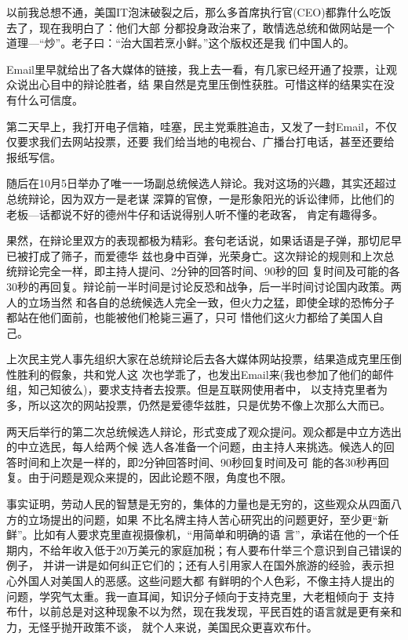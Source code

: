 ﻿\documentclass[11pt]{article}
\begin{document}
以前我总想不通，美国IT泡沫破裂之后，那么多首席执行官(CEO)都靠什么吃饭去了，现在我明白了：他们大部
分都投身政治来了，敢情选总统和做网站是一个道理---``炒''。老子曰：``治大国若烹小鲜。''这个版权还是我
们中国人的。


Email里早就给出了各大媒体的链接，我上去一看，有几家已经开通了投票，让观众说出心目中的辩论胜者，结
果自然是克里压倒性获胜。可惜这样的结果实在没有什么可信度。

第二天早上，我打开电子信箱，哇塞，民主党乘胜追击，又发了一封Email，不仅仅要求我们去网站投票，还要
我们给当地的电视台、广播台打电话，甚至还要给报纸写信。

随后在10月5日举办了唯一一场副总统候选人辩论。我对这场的兴趣，其实还超过总统辩论，因为双方一是老谋
深算的官僚，一是形象阳光的诉讼律师，比他们的老板---话都说不好的德州牛仔和话说得别人听不懂的老政客，
肯定有趣得多。

果然，在辩论里双方的表现都极为精彩。套句老话说，如果话语是子弹，那切尼早已被打成了筛子，而爱德华
兹也身中百弹，光荣身亡。这次辩论的规则和上次总统辩论完全一样，即主持人提问、2分钟的回答时间、90秒的回
复时间及可能的各30秒的再回复。辩论前一半时间是讨论反恐和战争，后一半时间讨论国内政策。两人的立场当然
和各自的总统候选人完全一致，但火力之猛，即使全球的恐怖分子都站在他们面前，也能被他们枪毙三遍了，只可
惜他们这火力都给了美国人自己。

上次民主党人事先组织大家在总统辩论后去各大媒体网站投票，结果造成克里压倒性胜利的假象，共和党人这
次也学乖了，也发出Email来(我也参加了他们的邮件组，知己知彼么)，要求支持者去投票。但是互联网使用者中，
以支持克里者为多，所以这次的网站投票，仍然是爱德华兹胜，只是优势不像上次那么大而已。

两天后举行的第二次总统候选人辩论，形式变成了观众提问。观众都是中立方选出的中立选民，每人给两个候
选人各准备一个问题，由主持人来挑选。候选人的回答时间和上次是一样的，即2分钟回答时间、90秒回复时间及可
能的各30秒再回复。由于问题是观众来提的，因此论题不限，角度也不限。

事实证明，劳动人民的智慧是无穷的，集体的力量也是无穷的，这些观众从四面八方的立场提出的问题，如果
不比名牌主持人苦心研究出的问题更好，至少更``新鲜''。比如有人要求克里直视摄像机，``用简单和明确的语
言''，承诺在他的一个任期内，不给年收入低于20万美元的家庭加税；有人要布什举三个意识到自己错误的例子，
并讲一讲是如何纠正它们的；还有人引用家人在国外旅游的经验，表示担心外国人对美国人的恶感。这些问题大都
有鲜明的个人色彩，不像主持人提出的问题，学究气太重。我一直耳闻，知识分子倾向于支持克里，大老粗倾向于
支持布什，以前总是对这种现象不以为然，现在我发现，平民百姓的语言就是更有亲和力，无怪乎抛开政策不谈，
就个人来说，美国民众更喜欢布什。
\end{document}
